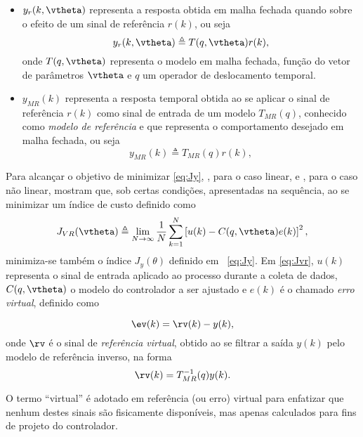 \begin{itemize}
    \item $y_r(k,\vtheta)$ representa a resposta obtida em malha fechada quando sobre o efeito de um sinal de referência $r(k)$, ou seja
    \begin{equation}
        y_r(k,\vtheta) \triangleq T(q,\vtheta)r(k)
    \label{eq:yr},
    \end{equation}
    onde $T(q,\vtheta)$ representa o modelo em malha fechada, função do vetor de parâmetros $\vtheta$ e $q$ um operador de deslocamento temporal.
   \item $y_{MR}(k)$ representa a resposta temporal obtida ao se aplicar o sinal de referência $r(k)$ como sinal de entrada de um modelo $T_{MR}(q)$, conhecido como \textit{modelo de referência} e que representa o comportamento desejado em malha fechada, ou seja
    \begin{equation}
        y_{MR}(k) \triangleq T_{MR}(q)r(k)
    \label{eq:yMR},
    \end{equation}
\end{itemize}

Para alcançar o objetivo de minimizar \eqref{eq:Jy}, \cite{campi2002b}, para o caso linear, e \cite{campi2006a}, para o caso não linear, mostram que, sob certas condições, apresentadas na sequência, ao se minimizar um índice de custo definido como
\begin{equation}
    J_{VR}(\vtheta) \triangleq \lim_{N \to \infty}  \frac{1}{N} \sum_{k=1}^N \left[u(k) - C(q,\vtheta)e(k)\right]^2
\label{eq:Jvr},
\end{equation}
minimiza-se também o índice $J_y(\theta)$ definido em ~\eqref{eq:Jy}. Em \eqref{eq:Jvr}, $u(k)$ representa o sinal de entrada aplicado ao processo durante a coleta de dados, $C(q,\vtheta)$ o modelo do controlador a ser ajustado e $e(k)$ é o chamado \textit{erro virtual}, definido como

\begin{equation}
    \ev(k) = \rv(k) - y(k) 
\label{eq:ev},
\end{equation}
onde $\rv$ é o sinal de \textit{referência virtual}, obtido ao se filtrar a saída $y(k)$ pelo modelo de referência inverso, na forma
\begin{equation}
    \rv(k) = T_{MR}^{-1}(q)y(k)
\label{eq:refvirt}.
\end{equation}

O termo ``virtual'' é adotado em referência (ou erro) virtual para enfatizar que nenhum destes sinais são fisicamente disponíveis, mas apenas calculados para fins de projeto do controlador. 

